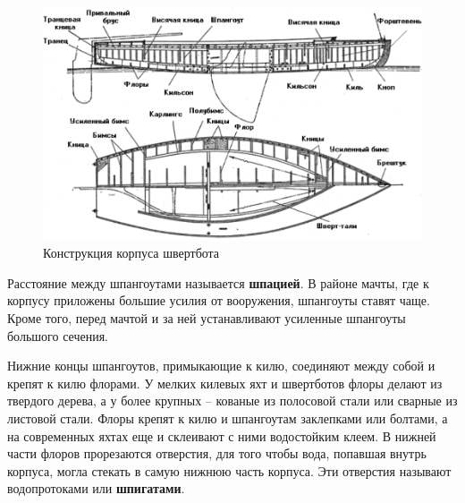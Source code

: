 \documentclass[a4paper, 12pt, twoside, final]{scrbook}
\begin{document}
\begin{figure}[htbp]
\begin{centering}
\includegraphics{Korpus_shvertbota}
\par\end{centering}

\protect\caption{\label{fig:26}Конструкция корпуса швертбота}
\end{figure}


Расстояние между шпангоутами называется \textbf{шпацией}. В районе
мачты, где к корпусу приложены большие усилия от вооружения, шпангоуты
ставят чаще. Кроме того, перед мачтой и за ней устанавливают усиленные
шпангоуты большого сечения.

Нижние концы шпангоутов, примыкающие к килю, соединяют между собой
и крепят к килю флорами. У мелких килевых яхт и швертботов флоры делают
из твердого дерева, а у более крупных \--- кованые из полосовой стали
или сварные из листовой стали. Флоры крепят к килю и шпангоутам заклепками
или болтами, а на современных яхтах еще и склеивают с ними водостойким
клеем. В нижней части флоров прорезаются отверстия, для того чтобы
вода, попавшая внутрь корпуса, могла стекать в самую нижнюю часть
корпуса. Эти отверстия называют водопротоками или \textbf{шпигатами}.
\end{document}
